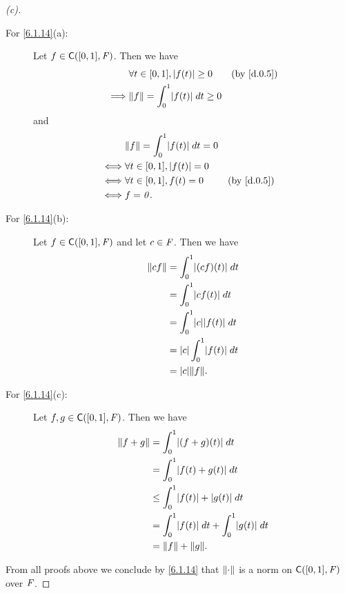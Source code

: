 \begin{proof}[(c)]
  \begin{description}
    \item[For \cref{6.1.14}(a):]
      Let \(f \in \cfs([0, 1], \F)\).
      Then we have
      \begin{align*}
                 & \forall t \in [0, 1], \abs{f(t)} \geq 0     &  & \text{(by \cref{d.0.5})} \\
        \implies & \norm{f} = \int_0^1 \abs{f(t)} \; dt \geq 0
      \end{align*}
      and
      \begin{align*}
             & \norm{f} = \int_0^1 \abs{f(t)} \; dt = 0                               \\
        \iff & \forall t \in [0, 1], \abs{f(t)} = 0                                   \\
        \iff & \forall t \in [0, 1], f(t) = 0           &  & \text{(by \cref{d.0.5})} \\
        \iff & f = \zv.
      \end{align*}
    \item[For \cref{6.1.14}(b):]
      Let \(f \in \cfs([0, 1], \F)\) and let \(c \in \mathit{F}\).
      Then we have
      \begin{align*}
        \norm{cf} & = \int_0^1 \abs{(cf)(t)} \; dt      \\
                  & = \int_0^1 \abs{cf(t)} \; dt        \\
                  & = \int_0^1 \abs{c} \abs{f(t)} \; dt \\
                  & = \abs{c} \int_0^1 \abs{f(t)} \; dt \\
                  & = \abs{c} \norm{f}.
      \end{align*}
    \item[For \cref{6.1.14}(c):]
      Let \(f, g \in \cfs([0, 1], \F)\).
      Then we have
      \begin{align*}
        \norm{f + g} & = \int_0^1 \abs{(f + g)(t)} \; dt                       \\
                     & = \int_0^1 \abs{f(t) + g(t)} \; dt                      \\
                     & \leq \int_0^1 \abs{f(t)} + \abs{g(t)} \; dt             \\
                     & = \int_0^1 \abs{f(t)} \; dt + \int_0^1 \abs{g(t)} \; dt \\
                     & = \norm{f} + \norm{g}.
      \end{align*}
  \end{description}
  From all proofs above we conclude by \cref{6.1.14} that \(\left\lVert\cdot\right\rVert\) is a norm on \(\cfs([0, 1], \F)\) over \(\mathit{F}\).
\end{proof}

